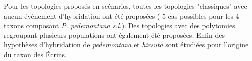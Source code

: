 Pour les topologies proposés en scénarios, toutes les topologies "classiques" avec aucun événement d'hybridation ont été proposées ( 5 cas possibles pour les 4 taxons composant  \textit{P. pedemontana s.l.}).
 Des topologies avec des polytomies regroupant plusieurs populations ont également été proposées.
 Enfin des hypothèses d'hybridation de \textit{pedemontana} et \textit{hirsuta} sont étudiées pour l'origine du taxon des Écrins.
